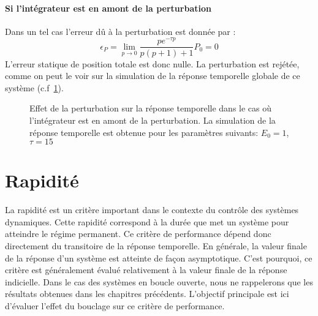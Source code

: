 \paragraph{Si l'intégrateur est en amont de la perturbation}
Dans un tel cas l'erreur dû à la perturbation est donnée par :
\[
\epsilon_P=\lim\limits_{p\to0}\dfrac{pe^{-\tau p}}{p(p+1)+1}P_0=0
\]
L'erreur statique de position totale est donc nulle. La perturbation
est rejétée, comme on peut le voir sur la simulation de la réponse
temporelle globale de ce système (c.f~\cref{fig-pert2}).
\begin{figure}[!h]
    \centering
    
    \caption{Effet de la perturbation sur la réponse temporelle dans le cas
             où l'intégrateur est en amont de la perturbation. La simulation
             de la réponse temporelle est obtenue pour les paramètres suivants: 
             $E_0=1$, $\tau=15$\label{fig-pert2}}
\end{figure}
\clearpage
\section{Rapidité}
La rapidité est un critère important dans le contexte du contrôle des 
systèmes dynamiques. Cette rapidité correspond à la durée que met un 
système pour atteindre le régime permanent. Ce critère de performance 
dépend donc directement du transitoire de la réponse temporelle. 
En générale, la valeur finale de la réponse d'un système est atteinte de 
façon asymptotique. C'est pourquoi, ce critère est généralement évalué 
relativement à la valeur finale de la réponse indicielle. 
Dans le cas des systèmes en boucle ouverte, nous ne rappelerons que les 
résultats obtenues dans les chapitres précédents. 
L'objectif principale est ici d'évaluer l'effet du bouclage sur ce critère 
de performance.
